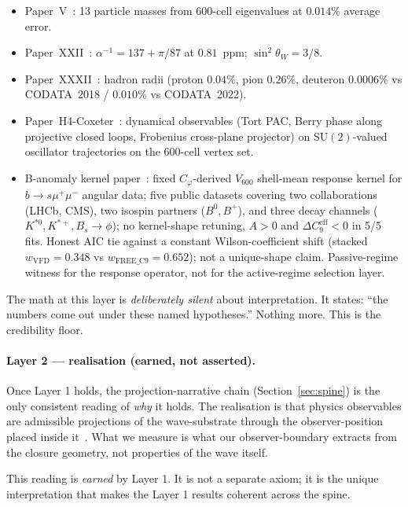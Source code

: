 \documentclass[12pt]{article}
\begin{document}
\begin{itemize}
    \item Paper~V~\citep{SmartV}: 13 particle masses from 600-cell eigenvalues at $0.014\%$ average error.
    \item Paper~XXII~\citep{SmartXXII}: $\alpha^{-1} = 137 + \pi/87$ at $0.81$~ppm; $\sin^2 \theta_W = 3/8$.
    \item Paper~XXXII~\citep{SmartXXXII}: hadron radii (proton $0.04\%$, pion $0.26\%$, deuteron $0.0006\%$ vs CODATA~2018 / $0.010\%$ vs CODATA~2022).
    \item Paper~H4-Coxeter~\citep{H4Coxeter2026}: dynamical observables (Tort PAC, Berry phase along projective closed loops, Frobenius cross-plane projector) on $\mathrm{SU}(2)$-valued oscillator trajectories on the 600-cell vertex set.
    \item B-anomaly kernel paper~\citep{SmartBAnomaly}: fixed $C_\varphi$-derived $V_{600}$ shell-mean response kernel for $b \to s\mu^+\mu^-$ angular data; five public datasets covering two collaborations (LHCb, CMS), two isospin partners ($B^0, B^+$), and three decay channels ($K^{*0}, K^{*+}, B_s\!\to\!\phi$); no kernel-shape retuning, $A > 0$ and $\Delta C_9^{\mathrm{eff}} < 0$ in 5/5 fits. Honest AIC tie against a constant Wilson-coefficient shift (stacked $w_{\mathrm{VFD}} = 0.348$ vs $w_{\mathrm{FREE\_C9}} = 0.652$); not a unique-shape claim. Passive-regime witness for the response operator, not for the active-regime selection layer.
\end{itemize}

The math at this layer is \emph{deliberately silent} about interpretation. It states: ``the numbers come out under these named hypotheses.'' Nothing more. This is the credibility floor.

\paragraph{Layer 2 --- realisation (earned, not asserted).}
Once Layer 1 holds, the projection-narrative chain (Section~\ref{sec:spine}) is the only consistent reading of \emph{why} it holds. The realisation is that physics observables are admissible projections of the wave-substrate through the observer-position placed inside it~\citep{SmartXXXIII}. What we measure is what our observer-boundary extracts from the closure geometry, not properties of the wave itself.

This reading is \emph{earned} by Layer 1. It is not a separate axiom; it is the unique interpretation that makes the Layer 1 results coherent across the spine.
\end{document}
